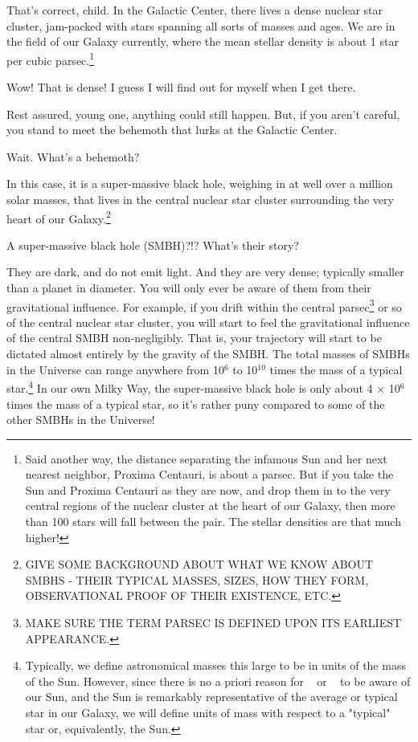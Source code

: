 \documentclass[main.tex]{subfiles}
\begin{document}
\par \Aethra That's correct, child.  In the Galactic Center, there lives a dense nuclear star cluster, jam-packed with stars spanning all sorts of masses and ages.  We are in the field of our Galaxy currently, where the mean stellar density is about 1 star per cubic parsec.\footnote{Said another way, the distance separating the infamous Sun and her next nearest neighbor, Proxima Centauri, is about a parsec.  But if you take the Sun and Proxima Centauri as they are now, and drop them in to the very central regions of the nuclear cluster at the heart of our Galaxy, then more than 100 stars will fall between the pair.  The stellar densities are that much higher!}

\par \Electra Wow!  That is dense!  I guess I will find out for myself when I get there.

\par \Aethra Rest assured, young one, anything could still happen.  But, if you aren't careful, you stand to meet the behemoth that lurks at the Galactic Center.

\par \Electra Wait.  What's a behemoth?

\par \Aethra In this case, it is a super-massive black hole, weighing in at well over a million solar masses, that lives in the central nuclear star cluster surrounding the very heart of our Galaxy.\footnote{GIVE SOME BACKGROUND ABOUT WHAT WE KNOW ABOUT SMBHS - THEIR TYPICAL MASSES, SIZES, HOW THEY FORM, OBSERVATIONAL PROOF OF THEIR EXISTENCE, ETC.}  

\par \Electra A super-massive black hole (SMBH)?!?  What's their story?

\par \Aethra They are dark, and do not emit light.  And they are very dense; typically smaller than a planet in diameter.  You will only ever be aware of them from their gravitational influence.  For example, if you drift within the central parsec\footnote{MAKE SURE THE TERM PARSEC IS DEFINED UPON ITS EARLIEST APPEARANCE.} or so of the central nuclear star cluster, you will start to feel the gravitational influence of the central SMBH non-negligibly.  That is, your trajectory will start to be dictated almost entirely by the gravity of the SMBH.  The total masses of SMBHs in the Universe can range anywhere from 10$^6$ to 10$^{10}$ times the mass of a typical star.\footnote{Typically, we define astronomical masses this large to be in units of the mass of the Sun.  However, since there is no a priori reason for \rmelectra~ or \rmaethra~ to be aware of our Sun, and the Sun is remarkably representative of the average or typical star in our Galaxy, we will define units of mass with respect to a "typical" star or, equivalently, the Sun.}  In our own Milky Way, the super-massive black hole is only about 4 $\times$ 10$^6$ times the mass of a typical star, so it's rather puny compared to some of the other SMBHs in the Universe!
\end{document}
